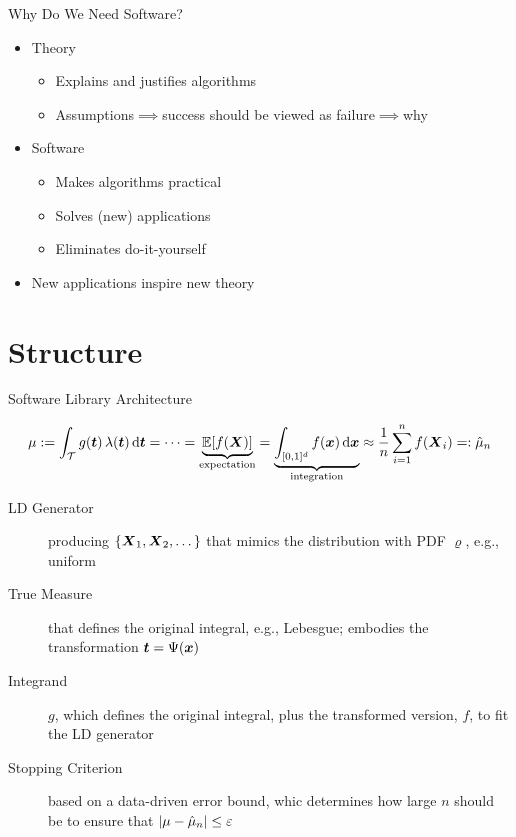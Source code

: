 \documentclass[11pt,compress,xcolor={usenames,dvipsnames},aspectratio=169]{beamer}
\begin{document}
\begin{frame}{Why Do We Need Software?}
	\begin{itemize}
		\item \alert{Theory} 
		\begin{itemize}
			\item Explains and justifies \alert{algorithms}
			\item Assumptions$\implies$success should be viewed as failure$\implies$why
		\end{itemize}
		\item \alert{Software} 
		\begin{itemize}
			\item Makes \alert{algorithms} practical
			\item Solves (new) \alert{applications}
			\item Eliminates do-it-yourself
		\end{itemize}
		\item New \alert{applications} inspire new \alert{theory}
	\end{itemize}
\end{frame}

\section{Structure}

\begin{frame}{Software Library Architecture}
	\vspace{-7ex}

\[
\mu :=  \int_{\mathcal{T}} g(\boldsymbol{t}) \, \lambda(\boldsymbol{t}) \, {\rm d} \boldsymbol{t} = \cdots = 	
\underbrace{\operatorname{\mathbb{E}}[f(\boldsymbol{X})]}_{\text{expectation}} = \underbrace{\int_{[0,1]^d}  f(\boldsymbol{x}) \, {\rm d} \boldsymbol{x}}_{\text{integration}} \approx  \frac 1{n} \sum_{i=1}^{n} f(\boldsymbol{X}_i) =: \hat{\mu}_{n}
\]

\vspace{-3ex}

\begin{description}
	
	\item[LD Generator] producing $\{\boldsymbol{X}_1, \boldsymbol{X}_2, \dots \}$ that mimics the distribution with PDF $\varrho$, e.g., uniform
	
	\item[True Measure] that defines the original integral, e.g., Lebesgue; embodies the transformation $\boldsymbol{t} = \Psi(\boldsymbol{x})$
	
	\item[Integrand] $g$, which defines the original integral, plus the transformed version, $f$, to fit the LD generator 
	
	\item[Stopping Criterion] based on a data-driven error bound, whic determines how large $n$ should be to ensure that $\left \lvert \mu - \hat{\mu}_n \right \rvert \le \varepsilon$
\end{description}

\vspace{-1ex}
\end{frame}
\end{document}
